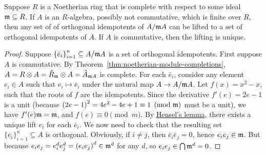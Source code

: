 \begin{corollary}
    Suppose \(R\) is a Noetherian ring that is complete with respect to some ideal \(\mathfrak{m} \subseteq R\).
    If \(A\) is an \(R\)-algebra, possibly not commutative, which is finite over \(R\),
    then any set of of orthogonal idempotents of \(A/\mathfrak{m}A\)
    can be lifted to a set of orthogonal idempotents of \(A\).
    If \(A\) is commutative, then the lifting is unique.
\end{corollary}
\begin{proof}
    Suppose \({\{\bar{e}_i\}}_{i=1}^n \subseteq A/\mathfrak{m}A\) is a set of orthogonal idempotents.
    First suppose \(A\) is commutative.
    By Theorem~\ref{thm:noetherian-module-completions},
    \(A = R \otimes A = \hat{R}_{\mathfrak{m}} \otimes A = \hat{A}_{\mathfrak{m}A}\) is complete.
    For each \(\bar{e}_i\),
    consider any element \(e_i \in A\) such that \(e_i \mapsto \bar{e}_i\)
    under the natural map \(A \to A/\mathfrak{m}A\).
    Let \(f(x) = x^2 - x\), such that the roots of \(f\) are the idempotents.
    Since the derivative \(f'(e) = 2e - 1\) is a unit
    (because \({(2e-1)}^2 = 4e^2-4e+1 \equiv 1 \pmod{\mathfrak{m}}\) must be a unit),
    we have \(f'(e)\mathfrak{m} = \mathfrak{m}\), and \(f(e) \equiv 0 \pmod{m}\).
    By \hyperref[thm:hensel]{Hensel's lemma},
    there exists a unique lift \(e_i\) for each \(\bar{e}_i\).
    We now need to check that the resulting set \({\{e_i\}}_{i=1}^n \subseteq A\) is orthogonal.
    Obviously, if \(i \neq j\), then \(\bar{e}_i\bar{e}_j = 0\), hence \(e_i e_j \in \mathfrak{m}\).
    But because \(e_i e_j = e_i^d e_j^d = {(e_i e_j)}^d \in \mathfrak{m}^d\) for any \(d\),
    so \(e_i e_j \in \bigcap \mathfrak{m}^d = 0\).


\end{proof}
